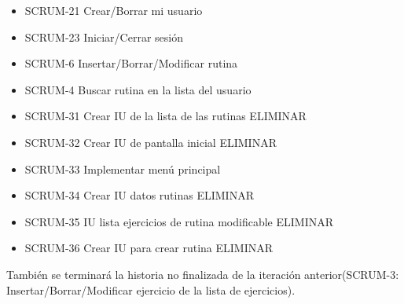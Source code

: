 \begin{itemize}
  \item SCRUM-21 Crear/Borrar mi usuario
  \item SCRUM-23 Iniciar/Cerrar sesión
  \item SCRUM-6 Insertar/Borrar/Modificar rutina
  \item SCRUM-4 Buscar rutina en la lista del usuario
  \item SCRUM-31 Crear IU de la lista de las rutinas ELIMINAR
  \item SCRUM-32 Crear IU de pantalla inicial ELIMINAR
  \item SCRUM-33 Implementar menú principal
  \item SCRUM-34 Crear IU datos rutinas ELIMINAR
  \item SCRUM-35 IU lista ejercicios de rutina modificable ELIMINAR
  \item SCRUM-36 Crear IU para crear rutina ELIMINAR
\end{itemize}

También se terminará la historia no finalizada de la iteración anterior(SCRUM-3: Insertar/Borrar/Modificar ejercicio de la lista de ejercicios).


